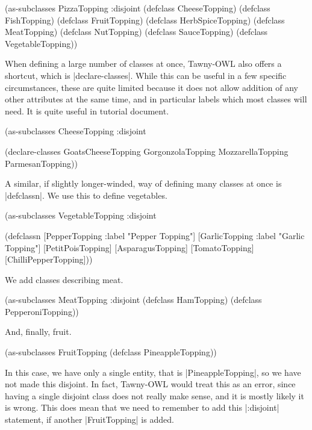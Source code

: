 \begin{tawny}
(as-subclasses
 PizzaTopping
 :disjoint
 (defclass CheeseTopping)
 (defclass FishTopping)
 (defclass FruitTopping)
 (defclass HerbSpiceTopping)
 (defclass MeatTopping)
 (defclass NutTopping)
 (defclass SauceTopping)
 (defclass VegetableTopping))
\end{tawny}

When defining a large number of classes at once, Tawny-OWL also offers
a shortcut, which is |declare-classes|. While this can be useful in a
few specific circumstances, these are quite limited because it does
not allow addition of any other attributes at the same time, and in
particular labels which most classes will need. It is quite useful in
tutorial document.

\begin{tawny}
(as-subclasses
 CheeseTopping
 :disjoint

 (declare-classes
  GoatsCheeseTopping
  GorgonzolaTopping
  MozzarellaTopping
  ParmesanTopping))
\end{tawny}

A similar, if slightly longer-winded, way of defining many classes at
once is |defclassn|. We use this to define vegetables.

\begin{tawny}
(as-subclasses
 VegetableTopping
 :disjoint

 (defclassn
  [PepperTopping
    :label "Pepper Topping"]
  [GarlicTopping
    :label "Garlic Topping"]
  [PetitPoisTopping]
  [AsparagusTopping]
  [TomatoTopping]
  [ChilliPepperTopping]))
\end{tawny}

We add classes describing meat.

\begin{tawny}
(as-subclasses
 MeatTopping
 :disjoint
 (defclass HamTopping)
 (defclass PepperoniTopping))
\end{tawny}

And, finally, fruit.

\begin{tawny}
(as-subclasses
 FruitTopping
 (defclass PineappleTopping))
\end{tawny}

In this case, we have only a single entity, that is
|PineappleTopping|, so we have not made this disjoint. In fact,
Tawny-OWL would treat this as an error, since having a single disjoint
class does not really make sense, and it is mostly likely it is
wrong. This does mean that we need to remember to add this |:disjoint|
statement, if another |FruitTopping| is added.

